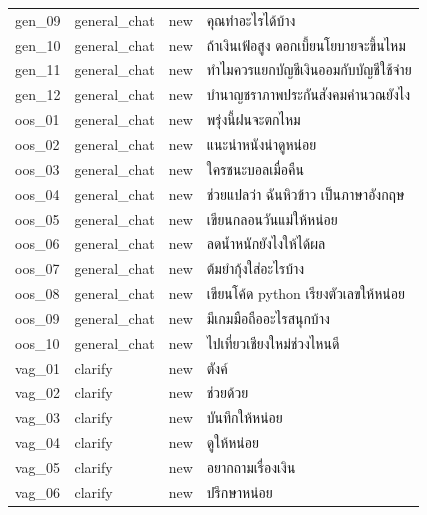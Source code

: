 \documentclass[11pt,a4paper]{article}
\begin{document}
{\begin{longtable}{lllp{9.5cm}}
gen\_\allowbreak{}09 & general\_\allowbreak{}chat & new & {\thaifont คุณทำอะไรได้บ้าง} \\
gen\_\allowbreak{}10 & general\_\allowbreak{}chat & new & {\thaifont ถ้าเงินเฟ้อสูง ดอกเบี้ยนโยบายจะขึ้นไหม} \\
gen\_\allowbreak{}11 & general\_\allowbreak{}chat & new & {\thaifont ทำไมควรแยกบัญชีเงินออมกับบัญชีใช้จ่าย} \\
gen\_\allowbreak{}12 & general\_\allowbreak{}chat & new & {\thaifont บำนาญชราภาพประกันสังคมคำนวณยังไง} \\
oos\_\allowbreak{}01 & general\_\allowbreak{}chat & new & {\thaifont พรุ่งนี้ฝนจะตกไหม} \\
oos\_\allowbreak{}02 & general\_\allowbreak{}chat & new & {\thaifont แนะนำหนังน่าดูหน่อย} \\
oos\_\allowbreak{}03 & general\_\allowbreak{}chat & new & {\thaifont ใครชนะบอลเมื่อคืน} \\
oos\_\allowbreak{}04 & general\_\allowbreak{}chat & new & {\thaifont ช่วยแปลว่า ฉันหิวข้าว เป็นภาษาอังกฤษ} \\
oos\_\allowbreak{}05 & general\_\allowbreak{}chat & new & {\thaifont เขียนกลอนวันแม่ให้หน่อย} \\
oos\_\allowbreak{}06 & general\_\allowbreak{}chat & new & {\thaifont ลดน้ำหนักยังไงให้ได้ผล} \\
oos\_\allowbreak{}07 & general\_\allowbreak{}chat & new & {\thaifont ต้มยำกุ้งใส่อะไรบ้าง} \\
oos\_\allowbreak{}08 & general\_\allowbreak{}chat & new & {\thaifont เขียนโค้ด }python {\thaifont เรียงตัวเลขให้หน่อย} \\
oos\_\allowbreak{}09 & general\_\allowbreak{}chat & new & {\thaifont มีเกมมือถืออะไรสนุกบ้าง} \\
oos\_\allowbreak{}10 & general\_\allowbreak{}chat & new & {\thaifont ไปเที่ยวเชียงใหม่ช่วงไหนดี} \\
vag\_\allowbreak{}01 & clarify & new & {\thaifont ตังค์} \\
vag\_\allowbreak{}02 & clarify & new & {\thaifont ช่วยด้วย} \\
vag\_\allowbreak{}03 & clarify & new & {\thaifont บันทึกให้หน่อย} \\
vag\_\allowbreak{}04 & clarify & new & {\thaifont ดูให้หน่อย} \\
vag\_\allowbreak{}05 & clarify & new & {\thaifont อยากถามเรื่องเงิน} \\
vag\_\allowbreak{}06 & clarify & new & {\thaifont ปรึกษาหน่อย} \\

\end{longtable}}
\end{document}

